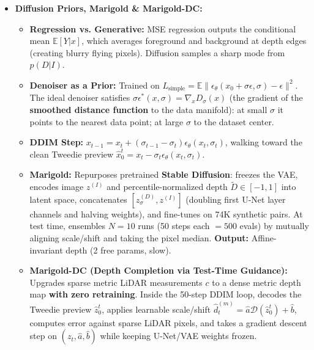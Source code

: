 \documentclass[10pt, a4paper]{article}
\begin{document}
\begin{itemize}
\begin{itemize}
        \item \textbf{Self-Supervised Stereo:} Trains without depth labels using photometric warp loss $\mathcal{L}_{\text{photo}} = \|\tilde{I}_L - I_L\|$ via \textbf{backward warping} $\tilde{I}_L(u,v) = I_R(u - d(u,v), v)$ (avoids holes/collisions of forward warping). \textbf{Blind spots:} Textureless regions (image gradient $I_R' = 0 \Rightarrow \frac{\partial \mathcal{L}}{\partial d} = 0$) and occlusions.
    \end{itemize}
    \item \textbf{Diffusion Priors, Marigold \& Marigold-DC:}
    \begin{itemize}
        \item \textbf{Regression vs. Generative:} MSE regression outputs the conditional mean $\mathbb{E}[Y|x]$, which averages foreground and background at depth edges (creating blurry flying pixels). Diffusion samples a sharp mode from $p(D|I)$.
        \item \textbf{Denoiser as a Prior:} Trained on $L_{\text{simple}} = \mathbb{E}\|\epsilon_\theta(x_0 + \sigma\epsilon, \sigma) - \epsilon\|^2$. The ideal denoiser satisfies $\sigma\epsilon^*(x, \sigma) = \nabla_x D_\sigma(x)$ (the gradient of the \textbf{smoothed distance function} to the data manifold): at small $\sigma$ it points to the nearest data point; at large $\sigma$ to the dataset center.
        \item \textbf{DDIM Step:} $x_{t-1} = x_t + (\sigma_{t-1} - \sigma_t)\epsilon_\theta(x_t, \sigma_t)$, walking toward the clean Tweedie preview $\hat{x}_0^t = x_t - \sigma_t\epsilon_\theta(x_t, \sigma_t)$.
        \item \textbf{Marigold:} Repurposes pretrained \textbf{Stable Diffusion}: freezes the VAE, encodes image $z^{(I)}$ and percentile-normalized depth $\tilde{D} \in [-1,1]$ into latent space, concatenates $[z_\sigma^{(D)}, z^{(I)}]$ (doubling first U-Net layer channels and halving weights), and fine-tunes on 74K synthetic pairs. At test time, ensembles $N=10$ runs (50 steps each $= 500$ evals) by mutually aligning scale/shift and taking the pixel median. \textbf{Output:} Affine-invariant depth (2 free params, slow).
        \item \textbf{Marigold-DC (Depth Completion via Test-Time Guidance):} Upgrades sparse metric LiDAR measurements $c$ to a dense metric depth map \textbf{with zero retraining}. Inside the 50-step DDIM loop, decodes the Tweedie preview $\hat{z}_0^t$, applies learnable scale/shift $\hat{d}_t^{(m)} = \hat{a}\mathcal{D}(\hat{z}_0^t) + \hat{b}$, computes error against sparse LiDAR pixels, and takes a gradient descent step on $(z_t, \hat{a}, \hat{b})$ while keeping U-Net/VAE weights frozen.
    \end{itemize}
\end{itemize}
\end{document}

